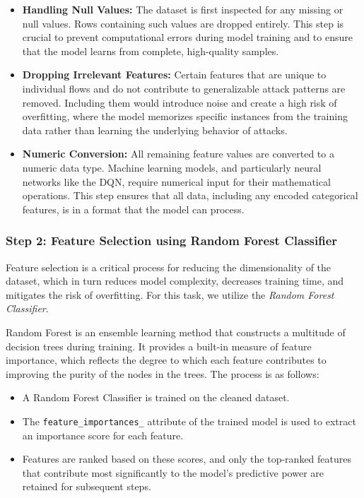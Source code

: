 \documentclass{report}
\begin{document}
\begin{itemize}
    \item \textbf{Handling Null Values:} The dataset is first inspected for any missing or null values. Rows containing such values are dropped entirely. This step is crucial to prevent computational errors during model training and to ensure that the model learns from complete, high-quality samples.

    \item \textbf{Dropping Irrelevant Features:} Certain features that are unique to individual flows and do not contribute to generalizable attack patterns are removed. Including them would introduce noise and create a high risk of overfitting, where the model memorizes specific instances from the training data rather than learning the underlying behavior of attacks.

    \item \textbf{Numeric Conversion:} All remaining feature values are converted to a numeric data type. Machine learning models, and particularly neural networks like the DQN, require numerical input for their mathematical operations. This step ensures that all data, including any encoded categorical features, is in a format that the model can process.
\end{itemize}

\subsubsection{Step 2: Feature Selection using Random Forest Classifier}

Feature selection is a critical process for reducing the dimensionality of the dataset, which in turn reduces model complexity, decreases training time, and mitigates the risk of overfitting. For this task, we utilize the \textit{Random Forest Classifier}.

Random Forest is an ensemble learning method that constructs a multitude of decision trees during training. It provides a built-in measure of feature importance, which reflects the degree to which each feature contributes to improving the purity of the nodes in the trees. The process is as follows:

\begin{itemize}
    \item A Random Forest Classifier is trained on the cleaned dataset.
    
    \item The \texttt{feature\_importances\_} attribute of the trained model is used to extract an importance score for each feature.
    
    \item Features are ranked based on these scores, and only the top-ranked features that contribute most significantly to the model’s predictive power are retained for subsequent steps.
\end{itemize}
\end{document}
